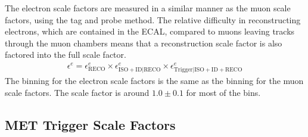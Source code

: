The electron scale factors are measured in a similar manner as the muon scale factors,
using the tag and probe method.
The relative difficulty in reconstructing electrons, which are contained in the ECAL,
compared to muons leaving tracks through the muon chambers
means that a reconstruction scale factor is also factored into the full scale factor.
\begin{gather}
  \epsilon^e = \epsilon^e_\mathrm{RECO} \times \epsilon^e_\mathrm{ISO + ID|RECO} \times \epsilon^e_\mathrm{Trigger|ISO + ID + RECO}
\end{gather}
The binning for the electron scale factors is the same as the binning
for the muon scale factors.
The scale factor is around $1.0 \pm 0.1$ for most of the bins.

\subsection{MET Trigger Scale Factors}

